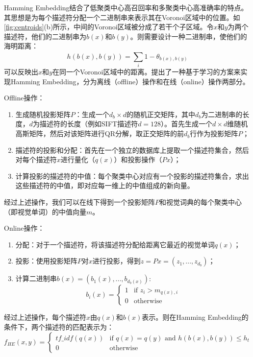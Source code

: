 Hamming Embedding结合了低聚类中心高召回率和多聚类中心高准确率的特点。其思想是为每个描述符分配一个二进制串来表示其在Voronoi区域中的位置。如\ref{fig:centroids}(b)所示，中间的Voronoi区域被分成了若干个子区域。令$x$和$y$为两个描述符，他们的二进制串为$b(x)$和$b(y)$。则需要设计一种二进制串，使他们的海明距离：
\begin{equation}
h(b(x),b(y))=\sum_{i}^{}1-\theta_{b(x),b(y)}
\end{equation}
可以反映出$x$和$y$在同一个Voronoi区域中的距离。\cite{jegou2008hamming}提出了一种基于学习的方案来实现Hamming Embedding，分为离线（offline）操作和在线（online）操作两部分。

Offline操作：
\begin{enumerate}
	\item 生成随机投影矩阵$P$：生成一个$d_b \times d$的随机正交矩阵，其中$d_b$为二进制串的长度，$d$为描述符的长度（例如SIFT描述符$d=128$）。首先生成一个$d \times d$维随机高斯矩阵，然后对该矩阵进行QR分解，取正交矩阵的前$d_b$行作为投影矩阵$P$；
	\item 描述符的投影和分配：首先在一个独立的数据库上提取一个描述符集合，然后对每个描述符$x$进行量化（$q(x)$）和投影操作（$Px$）；
	\item 计算投影的描述符的中值：每个聚类中心对应有一个投影的描述符集合，求出这些描述符的中值，即对应每一维上的中值组成的新向量。
\end{enumerate}

经过上述操作，我们可以在线下得到一个投影矩阵$P$和视觉词典的每个聚类中心（即视觉单词）的中值向量$m$。

Online操作：
\begin{enumerate}
	\item 分配：对于一个描述符，将该描述符分配给距离它最近的视觉单词$q(x)$；
	\item 投影：使用投影矩阵$P$对$x$进行投影，得到$z=Px=(z_1,...,z_{d_b})$；
	\item 计算二进制串$b(x)=(b_1(x),...,b_{d_b(x)})$:
	\begin{equation}
	b_i(x)=
	\begin{cases}
	1& \text{if $z_i > m_{q(x),i}$}\\
	0& \text{otherwise}
	\end{cases}
	\end{equation}
\end{enumerate}

经过上述操作，每个描述符$x$由$q(x)$和$b(x)$表示。则在Hamming Embedding的条件下，两个描述符的匹配表示为：
\begin{equation}
f_{HE}(x,y)=
\begin{cases}
tf\_idf(q(x))& \text{if $q(x)=q(y)$ and $h(b(x),b(y)) \le h_t$}\\
0& \text{otherwise}
\end{cases}
\end{equation}

